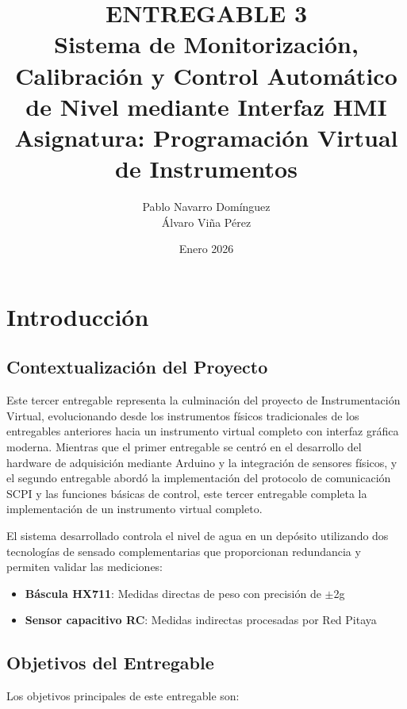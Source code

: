 \documentclass[12pt,a4paper]{article}
\title{
    \vspace{-2cm}
    \textbf{ENTREGABLE 3}\\
    \large Sistema de Monitorización, Calibración y Control Automático de Nivel mediante Interfaz HMI\\
    \vspace{0.5cm}
    \normalsize Asignatura: Programación Virtual de Instrumentos
}
\author{Pablo Navarro Domínguez\\Álvaro Viña Pérez}
\date{Enero 2026}
\begin{document}
\maketitle
\thispagestyle{empty}

\newpage
\tableofcontents
\newpage

\section{Introducción}

\subsection{Contextualización del Proyecto}

Este tercer entregable representa la culminación del proyecto de Instrumentación Virtual, evolucionando desde los instrumentos físicos tradicionales de los entregables anteriores hacia un instrumento virtual completo con interfaz gráfica moderna. Mientras que el primer entregable se centró en el desarrollo del hardware de adquisición mediante Arduino y la integración de sensores físicos, y el segundo entregable abordó la implementación del protocolo de comunicación SCPI y las funciones básicas de control, este tercer entregable completa la implementación de un instrumento virtual completo.

El sistema desarrollado controla el nivel de agua en un depósito utilizando dos tecnologías de sensado complementarias que proporcionan redundancia y permiten validar las mediciones:
\begin{itemize}
    \item \textbf{Báscula HX711}: Medidas directas de peso con precisión de $\pm$2g
    \item \textbf{Sensor capacitivo RC}: Medidas indirectas procesadas por Red Pitaya
\end{itemize}

\subsection{Objetivos del Entregable}

Los objetivos principales de este entregable son:
\end{document}
